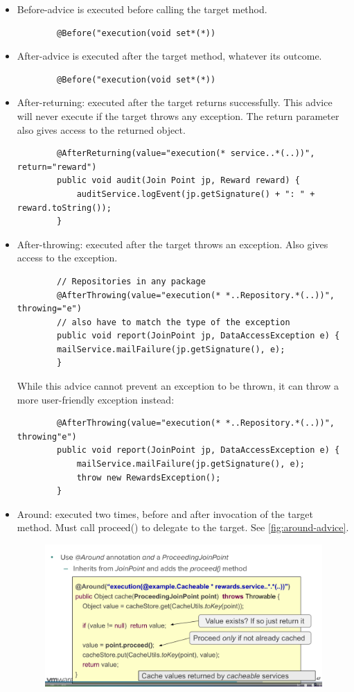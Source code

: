 \documentclass{scrartcl}
\begin{document}
\begin{itemize}
    \item Before-advice is executed before calling the target method.
    \begin{lstlisting}
        @Before("execution(void set*(*))    \end{lstlisting}
    \item
    After-advice is executed after the target method, whatever its outcome.
    \begin{lstlisting}
        @Before("execution(void set*(*))
    \end{lstlisting}
    \item
    After-returning: executed after the target returns successfully. This advice will never execute if the target throws any exception.
    The return parameter also gives access to the returned object.
    \begin{lstlisting}
        @AfterReturning(value="execution(* service..*(..))", return="reward")
        public void audit(Join Point jp, Reward reward) {
            auditService.logEvent(jp.getSignature() + ": " + reward.toString());
        }
    \end{lstlisting}
    \item
    After-throwing: executed after the target throws an exception.
    Also gives access to the exception.
    \begin{lstlisting}
        // Repositories in any package
        @AfterThrowing(value="execution(* *..Repository.*(..))", throwing="e")
        // also have to match the type of the exception
        public void report(JoinPoint jp, DataAccessException e) {
        mailService.mailFailure(jp.getSignature(), e);
        }
    \end{lstlisting}
    While this advice cannot prevent an exception to be thrown, it can throw a more user-friendly exception instead:
    \begin{lstlisting}
        @AfterThrowing(value="execution(* *..Repository.*(..))", throwing"e")
        public void report(JoinPoint jp, DataAccessException e) {
            mailService.mailFailure(jp.getSignature(), e);
            throw new RewardsException();
        }
    \end{lstlisting}
    \item
    Around: executed two times, before and after invocation of the target method. Must call proceed() to delegate to the target. See \ref{fig:around-advice}.
    \begin{figure}
        \centering
        \includegraphics[width=1\linewidth]{around-advice}

\end{figure}
\end{itemize}
\end{document}
